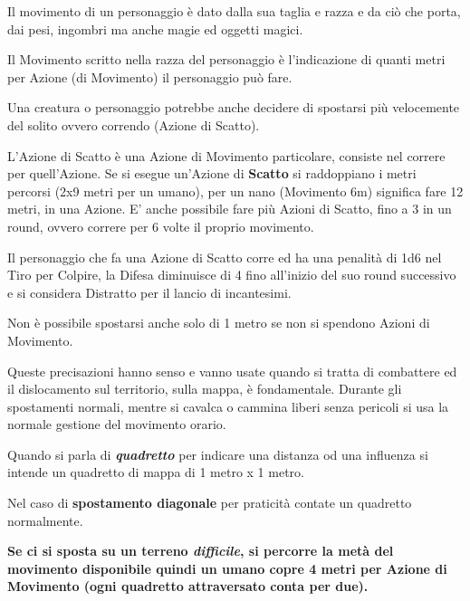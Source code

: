 \begin{multicols}{2}

Il movimento di un personaggio è dato dalla sua taglia e razza e da ciò che porta, dai pesi, ingombri ma anche magie ed oggetti magici.

Il Movimento scritto nella razza del personaggio è l'indicazione di quanti metri per Azione (di Movimento) il personaggio può fare.

Una creatura o personaggio potrebbe anche decidere di spostarsi più velocemente del solito ovvero correndo (Azione di Scatto).\label{azionediscatto}\hypertarget{azionediscatto}{}

L'Azione di Scatto è una Azione di Movimento particolare, consiste nel correre per quell'Azione.
Se si esegue un'Azione di \textbf{Scatto} si raddoppiano i metri percorsi (2x9 metri per un umano), per un nano (Movimento 6m) significa fare 12 metri, in una Azione.
E' anche possibile fare più Azioni di Scatto, fino a 3 in un round, ovvero correre per 6 volte il proprio movimento.

Il personaggio che fa una Azione di Scatto corre ed ha una penalità di 1d6 nel Tiro per Colpire, la Difesa diminuisce di 4 fino all'inizio del suo round successivo e si considera Distratto per il lancio di incantesimi.

Non è possibile spostarsi anche solo di 1 metro se non si spendono Azioni di Movimento.

Queste precisazioni hanno senso e vanno usate quando si tratta di combattere ed il dislocamento sul territorio, sulla mappa, è fondamentale. Durante gli spostamenti normali, mentre si cavalca o cammina liberi senza pericoli si usa la normale gestione del movimento orario.

Quando si parla di \textbf{\emph{quadretto}} per indicare una distanza od una influenza si intende un quadretto di mappa di 1 metro x 1 metro.


Nel caso di \textbf{spostamento diagonale} per praticità contate un quadretto normalmente.

\textbf{Se ci si sposta su un terreno \emph{difficile}, si percorre la metà del movimento disponibile quindi un umano copre 4 metri per Azione di Movimento (ogni quadretto attraversato conta per due).}


\end{multicols}
